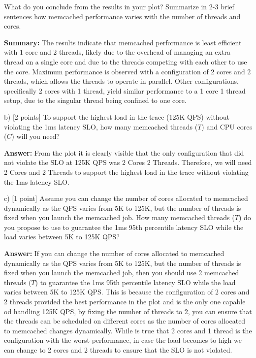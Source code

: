 \begin{enumerate}
    What do you conclude from the results in your plot? Summarize in 2-3 brief sentences how memcached performance varies with the number of threads and cores.
    
    \textbf{Summary:} The results indicate that memcached performance is least efficient with 1 core and 2 threads, likely due to the overhead of managing an extra thread on a single core and due to the threads competing with each other to use the core. Maximum performance is observed with a configuration of 2 cores and 2 threads, which allows the threads to operate in parallel. Other configurations, specifically 2 cores with 1 thread, yield similar performance to a 1 core 1 thread setup, due to the singular thread being confined to one core.
    
    
    b) [2 points] To support the highest load in the trace (125K QPS) without violating the 1ms latency SLO, how many memcached threads ($T$) and CPU cores ($C$) will you need?
    
    \textbf{Answer:} From the plot it is clearly visible that the only configuration that did not violate the SLO at 125K QPS was 2 Cores 2 Threads. Therefore, we will need 2 Cores and 2 Threads to support the highest load in the trace without violating the 1ms latency SLO.
    
    c) [1 point] Assume you can change the number of cores allocated to memcached dynamically as the QPS varies from 5K to 125K, but the number of threads is fixed when you launch the memcached job. How many memcached threads ($T$) do you propose to use to guarantee the 1ms 95th percentile latency SLO while the load varies between 5K to 125K QPS?
    
    \textbf{Answer:} If you can change the number of cores allocated to memcached dynamically as the QPS varies from 5K to 125K, but the number of threads is fixed when you launch the memcached job, then you should use 2 memcached threads ($T$) to guarantee the 1ms 95th percentile latency SLO while the load varies between 5K to 125K QPS. This is because the configuration of 2 cores and 2 threads provided the best performance in the plot and is the only one capable od handling 125K QPS, by fixing the number of threads to 2, you can ensure that the threads can be scheduled on different cores as the number of cores allocated to memcached changes dynamically. While is true that 2 cores and 1 thread is the configuration with the worst performance, in case the load becomes to high we can change to 2 cores and 2 threads to ensure that the SLO is not violated.
    

\end{enumerate}
